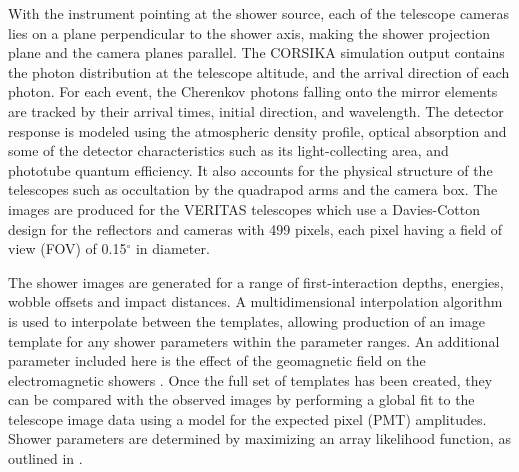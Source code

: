 \documentclass[main.tex]{subfiles}
\begin{document}
With the instrument pointing at the shower source, each of the telescope cameras lies on a plane perpendicular to the shower axis, making the shower projection plane and the camera planes parallel. The CORSIKA simulation output contains the photon distribution at the telescope altitude, and the arrival direction of each photon. For each event, the Cherenkov photons falling onto the mirror elements are tracked by their arrival times, initial direction, and wavelength. The detector response is modeled using the atmospheric density profile, optical absorption and some of the detector characteristics such as its light-collecting area, and phototube quantum efficiency. It also accounts for the physical structure of the telescopes such as occultation by the quadrapod arms and the camera box. The images are produced for the VERITAS telescopes which use a Davies-Cotton design for the reflectors and cameras with 499 pixels, each pixel having a field of view (FOV) of 0.15$^\circ$ in diameter.

The shower images are generated for a range of first-interaction depths, energies, wobble offsets and impact distances. A multidimensional interpolation algorithm is used to interpolate between the templates, allowing production of an image template for any shower parameters within the parameter ranges. An additional parameter included here is the effect of the geomagnetic field on the electromagnetic showers \cite{Vincent:2015bnj}.
Once the full set of templates has been created, they can be compared with the observed images by performing a global fit to the telescope image data using a model for the expected pixel (PMT) amplitudes. Shower parameters are determined by maximizing an array likelihood function, as outlined in \cite{deNaurois}.
\end{document}
